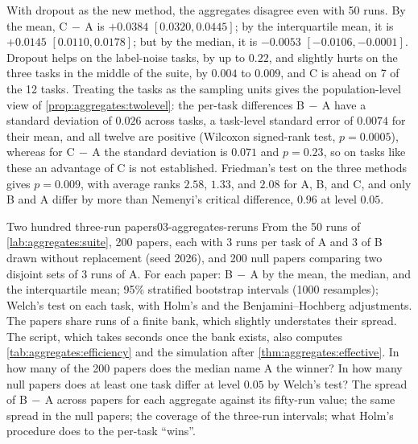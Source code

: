 \begin{refsection}
With dropout as the new method, the aggregates disagree even with 50 runs. By the mean, C$\,-\,$A is $+0.0384$ $[0.0320,0.0445]$; by the interquartile mean, it is $+0.0145$ $[0.0110,0.0178]$; but by the median, it is $-0.0053$ $[-0.0106,-0.0001]$. Dropout helps on the label-noise tasks, by up to $0.22$, and slightly hurts on the three tasks in the middle of the suite, by $0.004$ to $0.009$, and C is ahead on 7 of the 12 tasks. Treating the tasks as the sampling units gives the population-level view of \cref{prop:aggregates:twolevel}: the per-task differences B$\,-\,$A have a standard deviation of $0.026$ across tasks, a task-level standard error of $0.0074$ for their mean, and all twelve are positive (Wilcoxon signed-rank test, $p=0.0005$), whereas for C$\,-\,$A the standard deviation is $0.071$ and $p=0.23$, so on tasks like these an advantage of C is not established. Friedman's test on the three methods gives $p=0.009$, with average ranks $2.58$, $1.33$, and $2.08$ for A, B, and C, and only B and A differ by more than Nemenyi's critical difference, $0.96$ at level $0.05$.

\begin{lab}{Two hundred three-run papers}{03-aggregates-reruns}\label{lab:aggregates:replications}
 From the 50 runs of \cref{lab:aggregates:suite}, 200 papers, each with 3 runs per task of A and 3 of B drawn without replacement (seed 2026), and 200 null papers comparing two disjoint sets of 3 runs of A. For each paper: B$\,-\,$A by the mean, the median, and the interquartile mean; 95\% stratified bootstrap intervals (1000 resamples); Welch's test on each task, with Holm's and the Benjamini--Hochberg adjustments. The papers share runs of a finite bank, which slightly understates their spread. The script, which takes seconds once the bank exists, also computes \cref{tab:aggregates:efficiency} and the simulation after \cref{thm:aggregates:effective}.
 In how many of the 200 papers does the median name A the winner? In how many null papers does at least one task differ at level $0.05$ by Welch's test?
 The spread of B$\,-\,$A across papers for each aggregate against its fifty-run value; the same spread in the null papers; the coverage of the three-run intervals; what Holm's procedure does to the per-task ``wins''.
\end{lab}


\end{refsection}
